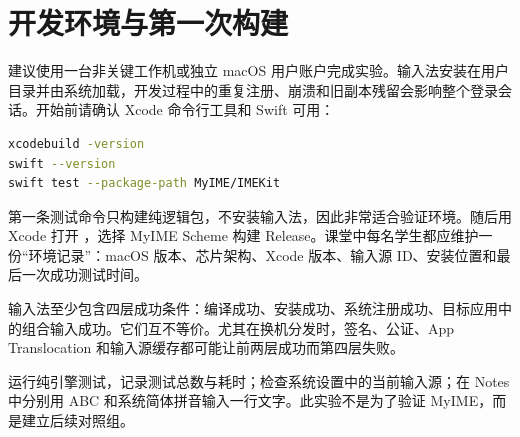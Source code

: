 
\chapter*{开发环境与第一次构建}

建议使用一台非关键工作机或独立 macOS 用户账户完成实验。输入法安装在用户目录并由系统加载，开发过程中的重复注册、崩溃和旧副本残留会影响整个登录会话。开始前请确认 Xcode 命令行工具和 Swift 可用：

\begin{lstlisting}[language=bash,numbers=none]
xcodebuild -version
swift --version
swift test --package-path MyIME/IMEKit
\end{lstlisting}

第一条测试命令只构建纯逻辑包，不安装输入法，因此非常适合验证环境。随后用 Xcode 打开 ，选择 MyIME Scheme 构建 Release。课堂中每名学生都应维护一份“环境记录”：macOS 版本、芯片架构、Xcode 版本、输入源 ID、安装位置和最后一次成功测试时间。

\begin{warningbox}
输入法至少包含四层成功条件：编译成功、安装成功、系统注册成功、目标应用中的组合输入成功。它们互不等价。尤其在换机分发时，签名、公证、App Translocation 和输入源缓存都可能让前两层成功而第四层失败。
\end{warningbox}

\begin{lab}[基线记录]
运行纯引擎测试，记录测试总数与耗时；检查系统设置中的当前输入源；在 Notes 中分别用 ABC 和系统简体拼音输入一行文字。此实验不是为了验证 MyIME，而是建立后续对照组。
\end{lab}

\clearpage
